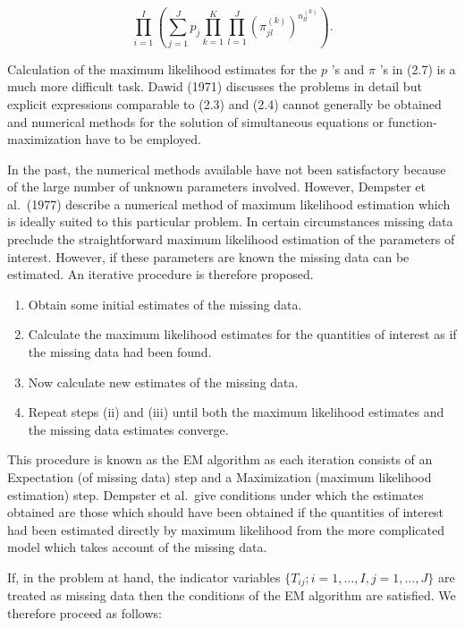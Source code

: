 \documentclass[
]{article}
\providecommand{\tightlist}{%
  \setlength{\itemsep}{0pt}\setlength{\parskip}{0pt}}
\begin{document}
\[
\prod_ {i = 1} ^ {I} \left(\sum_ {j = 1} ^ {J} p _ {j} \prod_ {k = 1} ^ {K} \prod_ {l = 1} ^ {J} \left(\pi_ {j l} ^ {(k)}\right) ^ {n _ {l l} ^ {(k)}}\right). \tag {2.7}
\]

Calculation of the maximum likelihood estimates for the \(p\) 's and
\(\pi\) 's in (2.7) is a much more difficult task. Dawid (1971)
discusses the problems in detail but explicit expressions comparable to
(2.3) and (2.4) cannot generally be obtained and numerical methods for
the solution of simultaneous equations or function-maximization have to
be employed.

In the past, the numerical methods available have not been satisfactory
because of the large number of unknown parameters involved. However,
Dempster et al.~(1977) describe a numerical method of maximum likelihood
estimation which is ideally suited to this particular problem. In
certain circumstances missing data preclude the straightforward maximum
likelihood estimation of the parameters of interest. However, if these
parameters are known the missing data can be estimated. An iterative
procedure is therefore proposed.

\begin{enumerate}
\def\labelenumi{(\roman{enumi})}
\tightlist
\item
  Obtain some initial estimates of the missing data.\\
\item
  Calculate the maximum likelihood estimates for the quantities of
  interest as if the missing data had been found.\\
\item
  Now calculate new estimates of the missing data.\\
\item
  Repeat steps (ii) and (iii) until both the maximum likelihood
  estimates and the missing data estimates converge.
\end{enumerate}

This procedure is known as the EM algorithm as each iteration consists
of an Expectation (of missing data) step and a Maximization (maximum
likelihood estimation) step. Dempster et al.~give conditions under which
the estimates obtained are those which should have been obtained if the
quantities of interest had been estimated directly by maximum likelihood
from the more complicated model which takes account of the missing data.

If, in the problem at hand, the indicator variables
\(\{T_{ij}; i=1,\ldots,I, j=1,\ldots,J\}\) are treated as missing data
then the conditions of the EM algorithm are satisfied. We therefore
proceed as follows:
\end{document}
